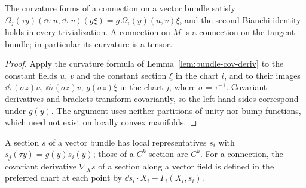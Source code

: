 \begin{theorem}
  \label{thm:curvature-gauge}
  \leanok
  The curvature forms of a connection on a vector bundle satisfy
  $\Omega_j(\tau y)(\dd\tau\, u, \dd\tau\, v)(g\xi) = g\,\Omega_i(y)(u, v)\xi$, and the second
  Bianchi identity holds in every trivialization. A connection on $M$ is a connection on the
  tangent bundle; in particular its curvature is a tensor.
\end{theorem}

\begin{proof}
  \leanok
  Apply the curvature formula of Lemma~\ref{lem:bundle-cov-deriv} to the constant fields $u$,
  $v$ and the constant section $\xi$ in the chart $i$, and to their images
  $\dd\tau(\sigma z)u$, $\dd\tau(\sigma z)v$, $g(\sigma z)\xi$ in the chart $j$, where
  $\sigma = \tau^{-1}$. Covariant derivatives and brackets transform covariantly, so the
  left-hand sides correspond under $g(y)$. The argument uses neither partitions of unity nor
  bump functions, which need not exist on locally convex manifolds.
\end{proof}

\begin{definition}
  \label{def:bundle-sections}
  \leanok
  A section $s$ of a vector bundle has local representatives $s_i$ with
  $s_j(\tau y) = g(y) s_i(y)$; those of a $C^k$ section are $C^k$. For a connection, the
  covariant derivative $\nabla_X s$ of a section along a vector field is defined in the
  preferred chart at each point by $\dd s_i \cdot X_i - \Gamma_i(X_i, s_i)$.
\end{definition}

